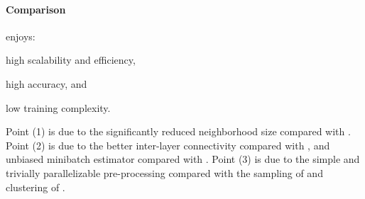 \paragraph{Comparison} %
{\graphsaint} enjoys: 
\begin{enumerate*}
\item high scalability and efficiency,%
\item high accuracy, and%
\item low training complexity.%
\end{enumerate*}
Point (1) is due to the significantly reduced neighborhood size compared with \cite{graphsage,gcn_web,s-gcn}. 
Point (2) is due to the better inter-layer connectivity compared with \cite{fastgcn}, and unbiased minibatch estimator compared with \cite{cluster-gcn}. 
Point (3) is due to the simple and trivially parallelizable pre-processing compared with the sampling of \cite{as-gcn} and clustering of \cite{cluster-gcn}. 
